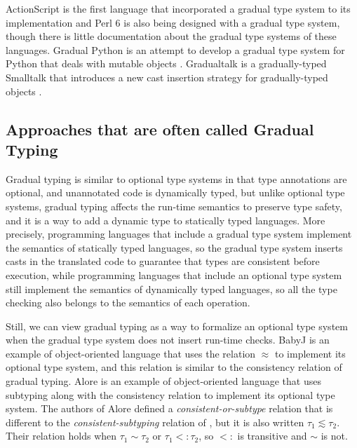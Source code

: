 \documentclass[preprint]{sig-alternate}
\begin{document}
ActionScript \cite{moock2007as3} is the first language that
incorporated a gradual type system to its implementation and
Perl 6 \cite{tang2007pri} is also being designed with a
gradual type system, though there is little documentation about
the gradual type systems of these languages.
Gradual Python \cite{reticulated} is an attempt to develop a
gradual type system for Python that deals with mutable objects
\cite{siek2013mutable}.
Gradualtalk \cite{allende2013gts} is a gradually-typed Smalltalk
that introduces a new cast insertion strategy for gradually-typed
objects \cite{allende2013cis}.

\subsection{Approaches that are often called Gradual Typing}

Gradual typing is similar to optional type systems in that type
annotations are optional, and unannotated code is dynamically
typed, but unlike optional type systems, gradual typing affects
the run-time semantics to preserve type safety, and it is a way to
add a dynamic type to statically typed languages. 
More precisely, programming languages that include a gradual type
system implement the semantics of statically typed languages, so
the gradual type system inserts casts in the translated code to
guarantee that types are consistent before execution, while
programming languages that include an optional type system still
implement the semantics of dynamically typed languages, so all
the type checking also belongs to the semantics of each operation.

Still, we can view gradual typing as a way to formalize an optional
type system when the gradual type system does not insert run-time
checks.
BabyJ \cite{anderson2002babyj} is an example of object-oriented
language that uses the relation $\approx$ to implement its optional
type system, and this relation is similar to the consistency relation
of gradual typing.
Alore \cite{lehtosalo2011alore} is an example of object-oriented
language that uses subtyping along with the consistency relation to
implement its optional type system.
The authors of Alore defined a \textit{consistent-or-subtype}
relation that is different to the \textit{consistent-subtyping}
relation of \cite{siek2007objects}, but it is also written
$\tau_{1} \lesssim \tau_{2}$.
Their relation holds when $\tau_{1} \sim \tau_{2}$ or $\tau_{1} <: \tau_{2}$,
so $<:$ is transitive and $\sim$ is not.
\end{document}
